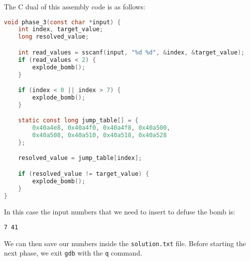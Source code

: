\documentclass[a4paper,12pt]{report}  %
\newcommand{\lstinlinebg}[1]{\colorbox{backcolour}{\lstinline|#1|}}
\begin{document}
The C dual of this assembly code is as follows:
\begin{lstlisting}[language=C,keywords={int, char, if, void, sscanf, explode_bomb, const, long, static}]
void phase_3(const char *input) {
    int index, target_value;
    long resolved_value;

    int read_values = sscanf(input, "%d %d", &index, &target_value);
    if (read_values < 2) {
        explode_bomb();
    }

    if (index < 0 || index > 7) {
        explode_bomb();
    }

    static const long jump_table[] = {
        0x40a4e8, 0x40a4f0, 0x40a4f8, 0x40a500,
        0x40a508, 0x40a510, 0x40a518, 0x40a528
    };

    resolved_value = jump_table[index];

    if (resolved_value != target_value) {
        explode_bomb();
    }
}
\end{lstlisting}    
In this case the input numbers that we need to insert to defuse the bomb is:
\begin{lstlisting}[numbers=none]
7 41
\end{lstlisting}
We can then save our numbers inside the \lstinlinebg{solution.txt} file.
Before starting the next phase, we exit \lstinlinebg{gdb} with the \lstinlinebg{q} command.
\end{document}

